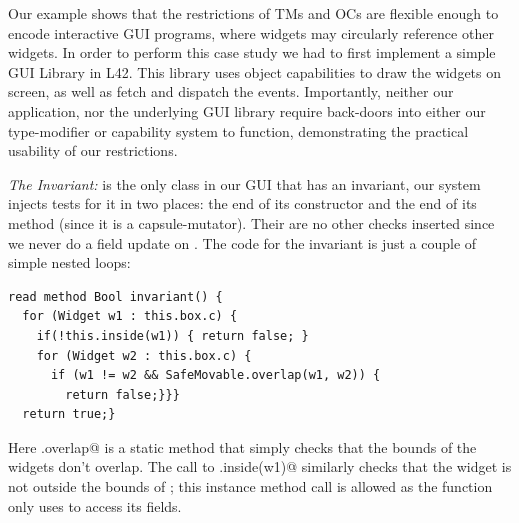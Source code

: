 Our example shows that the restrictions of TMs and OCs are flexible enough to encode interactive GUI programs, where widgets may circularly reference other widgets.
In order to perform this case study we had to first implement a simple GUI Library in L42. This library uses object capabilities to draw the widgets on screen, as well as fetch and dispatch the events. Importantly, neither our application, nor the underlying GUI library require back-doors into either our type-modifier or capability system to function, demonstrating the practical usability of our restrictions.


\textit{The Invariant:}
\Q@SafeMovable@ is the only class in our GUI that has an invariant, our system injects tests for it in two places: the end of its constructor and the end of its \Q@dispatch@ method (since it is a capsule-mutator). Their are no other checks inserted since we never do a field update on  \Q@SafeMovable@s. The code for the invariant is just a couple of simple nested loops:
\begin{lstlisting}
read method Bool invariant() {
  for (Widget w1 : this.box.c) {
    if(!this.inside(w1)) { return false; }
    for (Widget w2 : this.box.c) {
      if (w1 != w2 && SafeMovable.overlap(w1, w2)) {
        return false;}}}
  return true;}
\end{lstlisting}
Here \Q@SafeMovable.overlap@ is a static method that simply checks that the bounds of the widgets don't overlap. The call to \Q@this.inside(w1)@ similarly checks that the widget is not outside the bounds of \Q@this@; this instance method call is allowed as the function only uses \Q@this@ to access its fields.%


